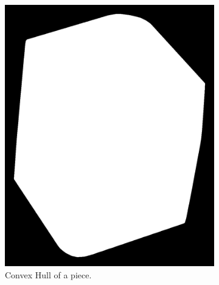\documentclass{article}
\begin{document}
\begin{figure}
\begin{subfigure}{0.3\textwidth}
    \includegraphics[width=\linewidth]{pictures/remove_holes_convex_hull.png}
    \caption{Convex Hull of a piece.}
    \label{fig:s_s_ch}
  \end{subfigure}
  \hfill
  \begin{subfigure}{0.3\textwidth}
    \centering

\end{subfigure}
\end{figure}
\end{document}
